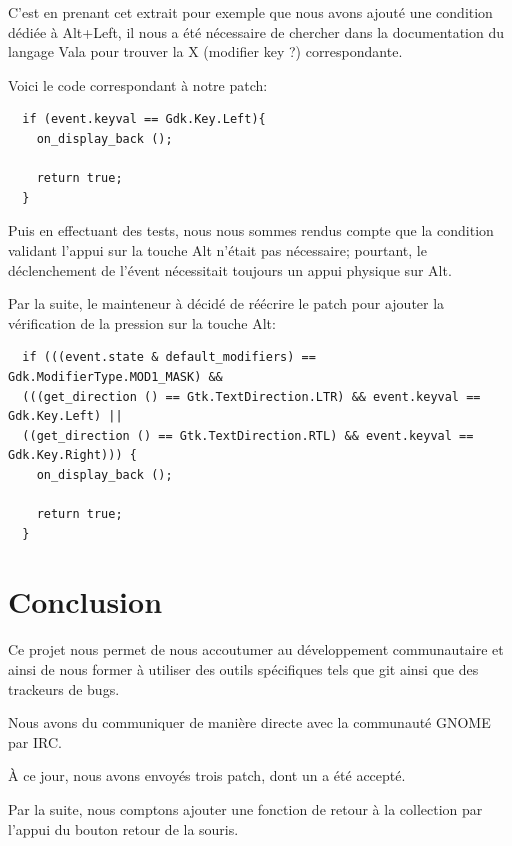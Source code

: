 \documentclass[12pt]{report}
\begin{document}
C'est en prenant cet extrait pour exemple que nous avons ajouté une
condition dédiée à Alt+Left, il nous a été nécessaire de chercher dans
la documentation du langage Vala pour trouver la X (modifier key ?)
correspondante.

Voici le code correspondant à notre patch:

\begin{verbatim}
  if (event.keyval == Gdk.Key.Left){			
    on_display_back ();
    
    return true;
  }
\end{verbatim}

Puis en effectuant des tests, nous nous sommes rendus compte que la
condition validant l'appui sur la touche Alt n'était pas nécessaire;
pourtant, le déclenchement de l'évent nécessitait toujours un appui
physique sur Alt.

Par la suite, le mainteneur à décidé de réécrire le patch pour ajouter
la vérification de la pression sur la touche Alt:

\begin{verbatim}
  if (((event.state & default_modifiers) == Gdk.ModifierType.MOD1_MASK) &&
  (((get_direction () == Gtk.TextDirection.LTR) && event.keyval == Gdk.Key.Left) ||
  ((get_direction () == Gtk.TextDirection.RTL) && event.keyval == Gdk.Key.Right))) {
    on_display_back ();

    return true;
  }
\end{verbatim}

\section{Conclusion}
Ce projet nous permet de nous accoutumer au développement
communautaire et ainsi de nous former à utiliser des outils
spécifiques tels que git ainsi que des trackeurs de bugs.

Nous avons du communiquer de manière directe avec la communauté GNOME
par IRC.

À ce jour, nous avons envoyés trois patch, dont un a été accepté.

Par la suite, nous comptons ajouter une fonction de retour à la
collection par l'appui du bouton retour de la souris.
\end{document}
